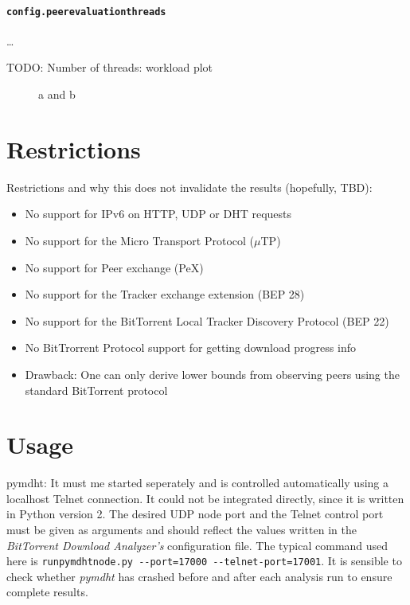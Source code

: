 \documentclass[10pt, a4paper, twoside, headsepline]{scrbook}
\renewcommand{\_}{\origunderscore\allowbreak}
\newcommand{\config}[1]{\texttt{config.\allowbreak #1}}
\begin{document}
\paragraph{\config{peer\_evaluation\_threads}}
\dots

TODO: Number of threads: workload plot

\begin{figure}
\centering
\caption[Load parameters during the analysis]{a and b}
\label{load}
\end{figure}

\section{Restrictions}

Restrictions and why this does not invalidate the results (hopefully, TBD):

\begin{itemize}
  \item No support for IPv6 on HTTP, UDP or DHT requests
  \item No support for the Micro Transport Protocol ($\mu$TP)
  \item No support for Peer exchange (PeX)
  \item No support for the Tracker exchange extension (BEP 28)
  \item No support for the BitTorrent Local Tracker Discovery Protocol (BEP 22)
  \item No BitTrorrent Protocol support for getting download progress info
  \item Drawback: One can only derive lower bounds from observing peers using the standard BitTorrent protocol
\end{itemize}


\section{Usage}
pymdht: It must me started seperately and is controlled automatically using a localhost Telnet connection. It could not be integrated directly, since it is written in Python version 2. The desired UDP node port and the Telnet control port must be given as arguments and should reflect the values written in the \emph{BitTorrent Download Analyzer's} configuration file. The typical command used here is \texttt{run\_pymdht\_node.py -{}-port=17000 -{}-telnet-port=17001}. It is sensible to check whether \emph{pymdht} has crashed before and after each analysis run to ensure complete results.
\end{document}
